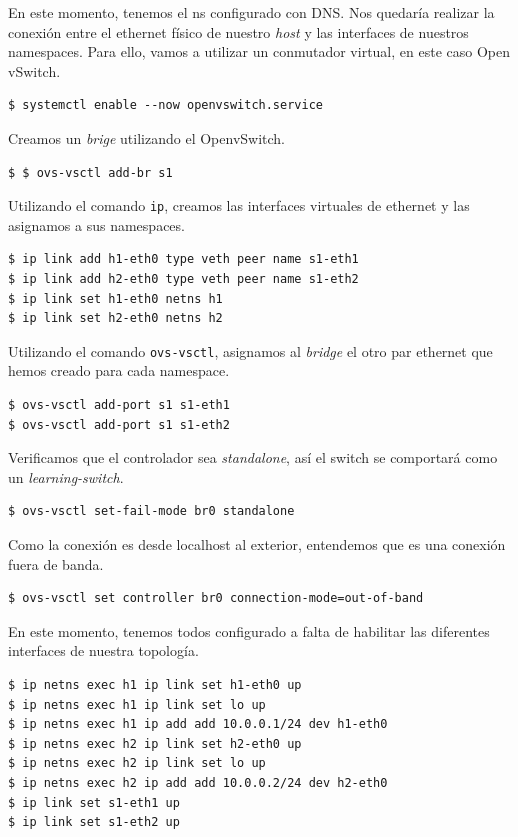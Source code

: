 \documentclass[12pt]{article}
\begin{document}
	\noindent En este momento, tenemos el ns configurado con DNS. Nos quedaría realizar la conexión entre el ethernet físico de nuestro \textit{host} y las interfaces de nuestros namespaces. Para ello, vamos a utilizar un conmutador virtual, en este caso Open vSwitch.
	\begin{verbatim}
$ systemctl enable --now openvswitch.service
	\end{verbatim}

	\noindent Creamos un \textit{brige} utilizando el OpenvSwitch.
	\begin{verbatim}
$ $ ovs-vsctl add-br s1
	\end{verbatim}

	\noindent Utilizando el comando \texttt{ip}, creamos las interfaces virtuales de ethernet y las asignamos a sus namespaces.
	\begin{verbatim}
$ ip link add h1-eth0 type veth peer name s1-eth1
$ ip link add h2-eth0 type veth peer name s1-eth2
$ ip link set h1-eth0 netns h1
$ ip link set h2-eth0 netns h2
	\end{verbatim}

	\pagebreak
	
	\noindent Utilizando el comando \texttt{ovs-vsctl}, asignamos al \textit{bridge} el otro par ethernet que hemos creado para cada namespace.
	\begin{verbatim}
$ ovs-vsctl add-port s1 s1-eth1
$ ovs-vsctl add-port s1 s1-eth2
	\end{verbatim}

	\noindent Verificamos que el controlador sea \textit{standalone}, así el switch se comportará como un \textit{learning-switch}.
	\begin{verbatim}
$ ovs-vsctl set-fail-mode br0 standalone
	\end{verbatim}

	\noindent Como la conexión es desde localhost al exterior, entendemos que es una conexión fuera de banda.
	\begin{verbatim}
$ ovs-vsctl set controller br0 connection-mode=out-of-band
	\end{verbatim}

	\noindent En este momento, tenemos todos configurado a falta de habilitar las diferentes interfaces de nuestra topología.
	\begin{verbatim}
$ ip netns exec h1 ip link set h1-eth0 up
$ ip netns exec h1 ip link set lo up
$ ip netns exec h1 ip add add 10.0.0.1/24 dev h1-eth0
$ ip netns exec h2 ip link set h2-eth0 up
$ ip netns exec h2 ip link set lo up
$ ip netns exec h2 ip add add 10.0.0.2/24 dev h2-eth0
$ ip link set s1-eth1 up
$ ip link set s1-eth2 up
	\end{verbatim}
\end{document}
